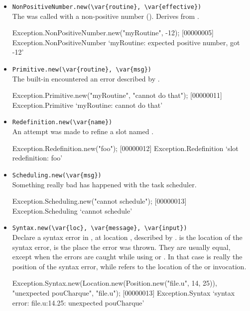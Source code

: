 \begin{itemize}
\item \lstinline|NonPositiveNumber.new(\var{routine}, \var{effective})|\\
  The  was called with a non-positive number
  ().  Derives from .
\begin{urbiscript}
Exception.NonPositiveNumber.new("myRoutine", -12);
[00000005] Exception.NonPositiveNumber `myRoutine: expected positive number, got -12'
\end{urbiscript}

\item \lstinline|Primitive.new(\var{routine}, \var{msg})|\\
  The built-in  encountered an error described by
  .
\begin{urbiscript}
Exception.Primitive.new("myRoutine", "cannot do that");
[00000011] Exception.Primitive `myRoutine: cannot do that'
\end{urbiscript}

\item \lstinline|Redefinition.new(\var{name})|\\
  An attempt was made to refine a slot named .
\begin{urbiscript}
Exception.Redefinition.new("foo");
[00000012] Exception.Redefinition `slot redefinition: foo'
\end{urbiscript}

\item \lstinline|Scheduling.new(\var{msg})|\\
  Something really bad has happened with the \urbi task scheduler.
\begin{urbiscript}
Exception.Scheduling.new("cannot schedule");
[00000013] Exception.Scheduling `cannot schedule'
\end{urbiscript}

\item \lstinline|Syntax.new(\var{loc}, \var{message}, \var{input})|\\
  Declare a syntax error in , at location ,
  described by .   is the location of the syntax
  error,  is the place the error was thrown.  They are
  usually equal, except when the errors are caught while using
   or .  In that case
   is really the position of the syntax error, while
   refers to the location of the 
  or  invocation.
\begin{urbiscript}
Exception.Syntax.new(Location.new(Position.new("file.u", 14, 25)),
                     "unexpected pouCharque", "file.u");
[00000013] Exception.Syntax `syntax error: file.u:14.25: unexpected pouCharque'


\end{urbiscript}
\end{itemize}
